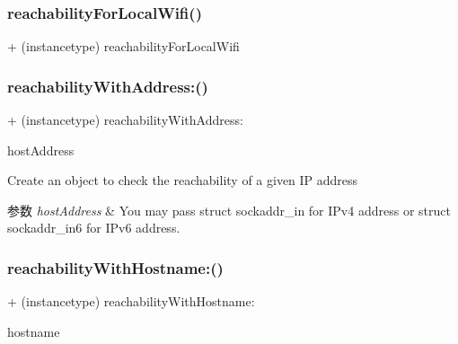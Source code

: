 \subsubsection{\texorpdfstring{reachability\+For\+Local\+Wifi()}{reachabilityForLocalWifi()}}
{\footnotesize\ttfamily + (instancetype) reachability\+For\+Local\+Wifi \begin{DoxyParamCaption}{ }\end{DoxyParamCaption}\hspace{0.3cm}{\ttfamily [implementation]}}

\mbox{\label{interface_m_a_r_reachability_abf53893fed79ab36e7e1d439a7763226}} 
\subsubsection{\texorpdfstring{reachability\+With\+Address\+:()}{reachabilityWithAddress:()}}
{\footnotesize\ttfamily + (instancetype) reachability\+With\+Address\+: \begin{DoxyParamCaption}\item[{(const struct sockaddr $\ast$)}]{host\+Address }\end{DoxyParamCaption}}

Create an object to check the reachability of a given IP address 
\begin{DoxyParams}{参数}
{\em host\+Address} & You may pass {\ttfamily struct sockaddr\+\_\+in} for I\+Pv4 address or {\ttfamily struct sockaddr\+\_\+in6} for I\+Pv6 address. \\
\hline
\end{DoxyParams}
\mbox{\label{interface_m_a_r_reachability_a51361d8879b07756e6606da49af4a2a7}} 
\subsubsection{\texorpdfstring{reachability\+With\+Hostname\+:()}{reachabilityWithHostname:()}}
{\footnotesize\ttfamily + (instancetype) reachability\+With\+Hostname\+: \begin{DoxyParamCaption}\item[{(N\+S\+String $\ast$)}]{hostname }\end{DoxyParamCaption}}



